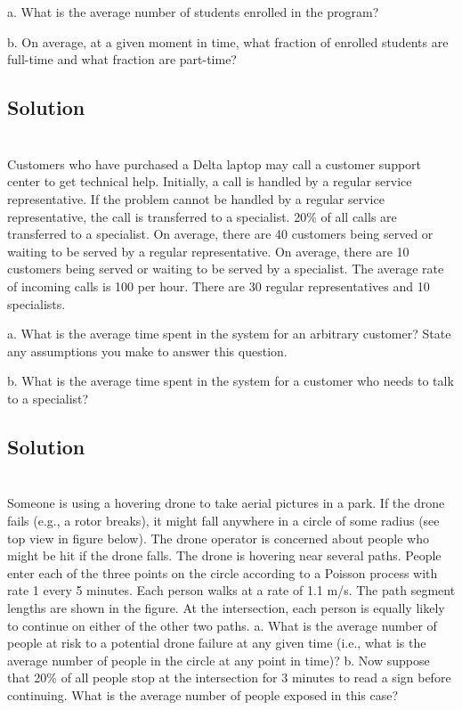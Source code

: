 \documentclass{amsart}
\begin{document}
a. What is the average number of students enrolled in the program?

b. On average, at a given moment in time, what fraction of enrolled students are
full-time and what fraction are part-time?

\subsection*{Solution}

\section{} %
Customers who have purchased a Delta laptop may call a customer support center to get
technical help. Initially, a call is handled by a regular service representative. If the
problem cannot be handled by a regular service representative, the call is transferred to a
specialist. 20\% of all calls are transferred to a specialist. On average, there are 40
customers being served or waiting to be served by a regular representative. On average,
there are 10 customers being served or waiting to be served by a specialist. The average
rate of incoming calls is 100 per hour. There are 30 regular representatives and 10
specialists.

a. What is the average time spent in the system for an arbitrary customer? State any
assumptions you make to answer this question.

b. What is the average time spent in the system for a customer who needs to talk to
a specialist?

\subsection*{Solution}

\section{} %
Someone is using a hovering drone to take aerial pictures in a park. If the drone fails
(e.g., a rotor breaks), it might fall anywhere in a circle of some radius (see top view in
figure below). The drone operator is concerned about people who might be hit if the
drone falls. The drone is hovering near several paths. People enter each of the three
points on the circle according to a Poisson process with rate 1 every 5 minutes. Each
person walks at a rate of 1.1 m/s. The path segment lengths are shown in the figure. At
the intersection, each person is equally likely to continue on either of the other two paths.
a. What is the average number of people at risk to a potential drone failure at any given
time (i.e., what is the average number of people in the circle at any point in time)?
b. Now suppose that 20\% of all people stop at the intersection for 3 minutes to read a
sign before continuing. What is the average number of people exposed in this case?
\end{document}
